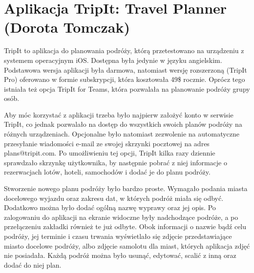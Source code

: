 \documentclass[10pt,twoside,a4paper]{report}
\begin{document}
\section{Aplikacja TripIt: Travel Planner (Dorota Tomczak)}
\par TripIt to aplikacja do planowania podróży, którą przetestowano na urządzeniu z systemem operacyjnym iOS. Dostępna była jedynie w języku angielskim. Podstawowa wersja aplikacji była darmowa, natomiast wersję rozszerzoną (TripIt Pro) oferowano w formie subskrypcji, która kosztowała 49\$ rocznie. Oprócz tego istniała też opcja TripIt for Teams, która pozwalała na planowanie podróży grupy osób.
\par Aby móc korzystać z aplikacji trzeba było najpierw założyć konto w serwisie TripIt, co jednak pozwalało na dostęp do wszystkich swoich planów podróży na różnych urządzeniach. Opcjonalne było natomiast zezwolenie na automatyczne przesyłanie wiadomości e-mail ze swojej skrzynki pocztowej na adres plans@tripit.com. Po umożliwieniu tej opcji, TripIt kilka razy dziennie sprawdzało skrzynkę użytkownika, by następnie pobrać z niej informacje o rezerwacjach lotów, hoteli, samochodów i dodać je do planu podróży.
\par Stworzenie nowego planu podróży było bardzo proste. Wymagało podania miasta docelowego wyjazdu oraz zakresu dat, w których podróż miała się odbyć. Dodatkowo można było dodać ogólną nazwę wyprawy oraz jej opis. Po zalogowaniu do aplikacji na ekranie widoczne były  nadchodzące podróże, a po przełączeniu zakładki również te już odbyte. Obok informacji o nazwie bądź celu podróży, jej terminie i czasu trwania wyświetlało się zdjęcie przedstawiające miasto docelowe podróży, albo zdjęcie samolotu dla miast, których aplikacja zdjęć nie posiadała. Każdą podróż można było usunąć, edytować, scalić z inną oraz dodać do niej plan. 
\end{document}
